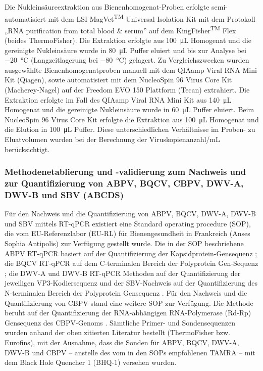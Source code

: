Die Nukleinsäureextraktion aus Bienenhomogenat-Proben erfolgte semi-automatisiert mit dem LSI MagVet\textsuperscript{TM} Universal Isolation Kit mit dem Protokoll „RNA purification from total blood \& serum” auf dem KingFisher\textsuperscript{TM} Flex (beides ThermoFisher). Die Extraktion erfolgte aus \SI{100}{\micro\liter} Homogenat und die gereinigte Nukleinsäure wurde in \SI{80}{\micro\liter} Puffer eluiert und bis zur Analyse bei \SI{-20}{\degreeCelsius} (Langzeitlagerung bei \SI{-80}{\degreeCelsius}) gelagert. Zu Vergleichszwecken wurden ausgewählte Bienenhomogenatproben manuell mit dem QIAamp Viral RNA Mini Kit (Qiagen), sowie automatisiert mit dem NucleoSpin\textsuperscript{\textregistered} 96 Virus Core Kit (Macherey-Nagel) auf der Freedom EVO\textsuperscript{\textregistered} 150 Plattform (Tecan) extrahiert. Die Extraktion erfolgte im Fall des QIAamp Viral RNA Mini Kit aus \SI{140}{\micro\liter} Homogenat und die gereinigte Nukleinsäure wurde in \SI{60}{\micro\liter} Puffer eluiert. Beim NucleoSpin\textsuperscript{\textregistered} 96 Virus Core Kit erfolgte die Extraktion aus \SI{100}{\micro\liter} Homogenat und die Elution in \SI{100}{\micro\liter} Puffer. Diese unterschiedlichen Verhältnisse im Proben- zu Eluatvolumen wurden bei der Berechnung der Viruskopienanzahl/\si{\milli\liter} berücksichtigt.

\subsubsection{Methodenetablierung und -validierung zum Nachweis und zur Quantifizierung von ABPV, BQCV, CBPV, DWV-A, DWV-B und SBV (ABCDS)}
\label{chap:methoden_abcds}

Für den Nachweis und die Quantifizierung von ABPV, BQCV, DWV-A, DWV-B und SBV mittels RT-qPCR existiert eine Standard operating procedure (SOP), die vom EU-Referenzlabor (EU-RL) für Bienengesundheit in Frankreich (Anses Sophia Antipolis) zur Verfügung gestellt wurde. Die in der SOP beschriebene ABPV RT-qPCR basiert auf der Quantifizierung der Kapsidprotein-Gensequenz \citep{jamnikar2012}; die BQCV RT-qPCR auf dem C-terminalen Bereich der Polyprotein Gen-Sequenz  \citep{chantawannakul2006}; die DWV-A und DWV-B RT-qPCR Methoden auf der Quantifizierung der jeweiligen VP3-Kodiersequenz \citep{schurr2019} und der SBV-Nachweis auf der Quantifizierung des N-terminalen Bereich der Polyprotein Gensequenz \citep{blanchard2014}. Für den Nachweis und die Quantifizierung von CBPV stand eine weitere SOP zur Verfügung. Die Methode beruht auf der Quantifizierung der RNA-abhängigen RNA-Polymerase (Rd-Rp) Gensequenz des CBPV-Genoms \citep{blanchard2007}. Sämtliche Primer- und Sondensequenzen wurden anhand der oben zitierten Literatur bestellt (ThermoFisher bzw. Eurofins), mit der Ausnahme, dass die Sonden für ABPV, BQCV, DWV-A, DWV-B und CBPV – anstelle des vom in den SOPs empfohlenen TAMRA – mit dem Black Hole Quencher 1 (BHQ-1) versehen wurden.

